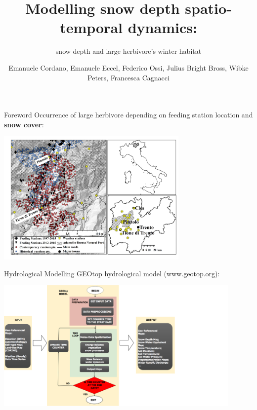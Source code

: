 \documentclass[
  ignorenonframetext,
]{beamer}
\title{Modelling snow depth spatio-temporal dynamics:}
\subtitle{snow depth and large herbivore's winter habitat}
\author{Emanuele Cordano, Emanuele Eccel, Federico Ossi, Julius Bright
Bross, Wibke Peters, Francesca Cagnacci}
\date{}
\begin{document}
\frame{\titlepage}

\begin{frame}{Foreword}
\protect\hypertarget{foreword}{}
Occurrence of large herbivore depending on feeding station location and
\textbf{snow cover}:

\includegraphics[width=0.7\textwidth,height=\textheight]{resources/images/rendena_roe_deer_meteo_v2.jpg}\\
\end{frame}

\begin{frame}{Hydrological Modelling}
\protect\hypertarget{hydrological-modelling}{}
GEOtop hydrological model (www.geotop.org):

\includegraphics[width=0.9\textwidth,height=\textheight]{resources/images/geotop_revised.png}\\
\end{frame}
\end{document}
